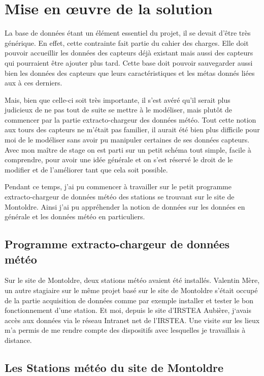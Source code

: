 \section{Mise en œuvre de la solution} 

La base de données étant un élément essentiel du projet, il se devait d’être très générique. En effet, cette contrainte fait partie du cahier des charges. Elle doit pouvoir accueillir les données des capteurs déjà existant mais aussi des capteurs qui pourraient être ajouter plus tard. Cette base doit pouvoir sauvegarder aussi bien les données des capteurs que leurs caractéristiques et les métas donnés liées aux à ces derniers. 

Mais, bien que celle-ci soit très importante, il s’est avéré qu’il serait plus judicieux de ne pas tout de suite se mettre à le modéliser, mais plutôt de commencer par la partie extracto-chargeur des données météo. Tout cette notion aux tours des capteurs ne m’était pas familier, il aurait été bien plus difficile pour moi de le modéliser sans avoir pu manipuler certaines de ses données capteurs. Avec mon maître de stage on est parti sur un petit schéma tout simple, facile à comprendre, pour avoir une idée générale et on s’est réservé le droit de le modifier et de l’améliorer tant que cela soit possible. 

Pendant ce temps, j’ai pu commencer à travailler sur le petit programme extracto-chargeur de données météo des stations se trouvant sur le site de Montoldre. Ainsi j’ai pu appréhender la notion de données sur les données en générale et les données météo en particuliers.  

 

\subsection{Programme extracto-chargeur de données météo}

Sur le site de Montoldre, deux stations météo avaient été installés. Valentin Mère, un autre stagiaire sur le même projet basé sur le site de Montoldre s’était occupé de la partie acquisition de données comme par exemple installer et tester le bon fonctionnement d’une station. Et moi, depuis le site d’IRSTEA Aubière, j‘avais accès aux données via le réseau Intranet net de l’IRSTEA. Une visite sur les lieux m’a permis de me rendre compte des dispositifs avec lesquelles je travaillais à distance.  

\subsection{Les Stations météo du site de Montoldre} 

